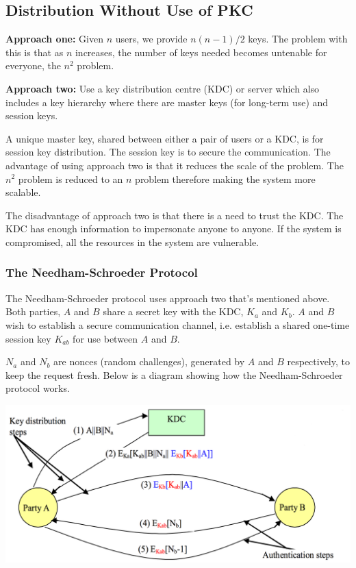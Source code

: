 \documentclass{article}
\begin{document}
\subsection{Distribution Without Use of PKC}
\textbf{Approach one:} Given $n$ users, we provide $n(n-1)/2$ keys. The problem with this is that as $n$ increases, the number of keys needed becomes untenable for everyone, the $n^{2}$ problem.

\textbf{Approach two:} Use a key distribution centre (KDC) or server which also includes a key hierarchy where there are master keys (for long-term use) and session keys.

A unique master key, shared between either a pair of users or a KDC, is for session key distribution. The session key is to secure the communication. The advantage of using approach two is that it reduces the scale of the problem. The $n^{2}$ problem is reduced to an $n$ problem therefore making the system more scalable.

The disadvantage of approach two is that there is a need to trust the KDC. The KDC has enough information to impersonate anyone to anyone. If the system is compromised, all the resources in the system are vulnerable.

\subsubsection{The Needham-Schroeder Protocol}
The Needham-Schroeder protocol uses approach two that's mentioned above. Both parties, $A$ and $B$ share a secret key with the KDC, $K_{a}$ and $K_{b}$. $A$ and $B$ wish to establish a secure communication channel, i.e. establish a shared one-time session key $K_{ab}$ for use between $A$ and $B$.

$N_{a}$ and $N_{b}$ are nonces (random challenges), generated by $A$ and $B$ respectively, to keep the request fresh. Below is a diagram showing how the Needham-Schroeder protocol works.
\begin{center}
  \includegraphics[scale=0.4]{nsp.png}
\end{center}
\end{document}
